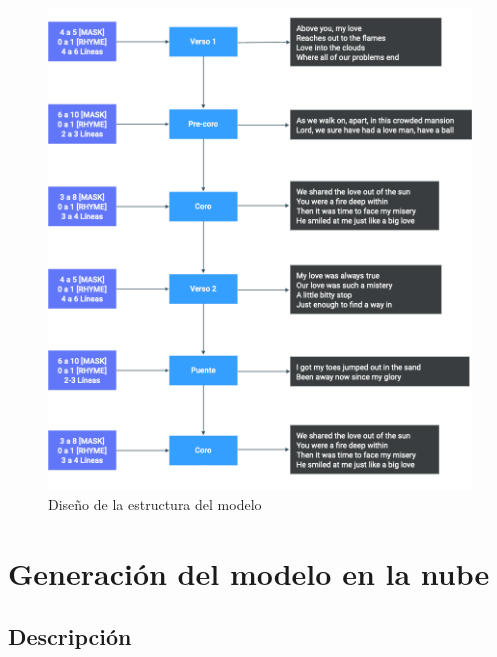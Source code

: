 \documentclass[12pt, a4paper, titlepage]{report}
\begin{document}
		\begin{figure}[H]
			\includegraphics[width=15cm]{./imagenes/Disenio/Arquitectura/Generacion_letras.png}
			\centering 
			\caption{Diseño de la estructura del modelo}
		\end{figure}
		
		\newpage
	
	\section{Generación del modelo en la nube} %
	\subsection{Descripción}
	
\end{document}
